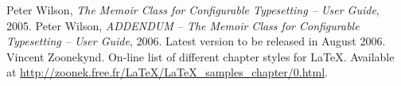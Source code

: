 \begin{thebibliography}{9}
 Peter Wilson, \emph{The Memoir Class for Configurable
  Typesetting -- User Guide}, 2005.
 Peter Wilson, \emph{ADDENDUM -- The Memoir Class for Configurable
  Typesetting -- User Guide}, 2006. Latest version to be released
  in August 2006.
 Vincent Zoonekynd. On-line list of different chapter
  styles for \LaTeX. Available at
  \url{http://zoonek.free.fr/LaTeX/LaTeX_samples_chapter/0.html}. 
\end{thebibliography}



